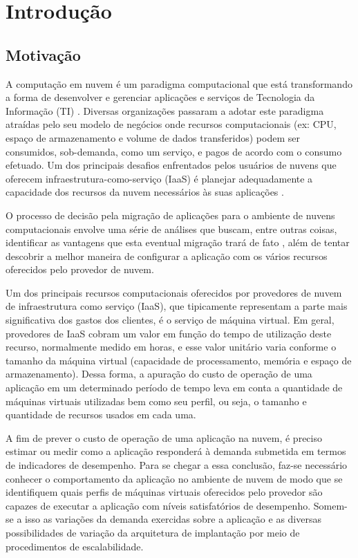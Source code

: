 \chapter[Introdução]{Introdução}
\section{Motivação}
A computação em nuvem é um paradigma computacional que está
transformando a forma de desenvolver e gerenciar aplicações e serviços de
Tecnologia da Informação (TI) \cite{Murugesan2014}. Diversas organizações passaram 
a adotar este paradigma atraídas pelo seu modelo de negócios onde recursos 
computacionais (ex: CPU, espaço de armazenamento e volume de dados transferidos) 
podem ser consumidos, sob-demanda, como um serviço, e pagos de acordo com o consumo 
efetuado. Um dos principais desafios enfrentados pelos usuários de nuvens que oferecem 
infraestrutura-como-serviço (IaaS) é planejar adequadamente a capacidade 
dos recursos da nuvem necessários às suas aplicações \cite{Menasce2009}.  

O processo de decisão pela migração de aplicações para o ambiente de nuvens 
computacionais envolve uma série de análises que buscam, entre outras coisas, 
identificar as vantagens que esta eventual migração trará de fato \cite{beserra2012cloudstep, 
rodero2010infrastructure}, além de tentar descobrir a melhor maneira de configurar 
a aplicação com os vários recursos oferecidos pelo provedor de nuvem.

Um dos principais recursos computacionais oferecidos por provedores de nuvem de 
infraestrutura como serviço (IaaS), que tipicamente representam a parte mais 
significativa dos gastos dos
clientes, é o serviço de máquina virtual. Em geral, provedores de IaaS cobram um
valor em função do tempo de utilização deste recurso, normalmente medido em horas, 
e esse valor unitário varia conforme o tamanho da máquina virtual (capacidade de 
processamento, memória e espaço de armazenamento). Dessa forma, a apuração do 
custo de operação de uma aplicação em um determinado período de tempo leva em 
conta a quantidade de máquinas virtuais utilizadas bem como seu perfil, ou seja, 
o tamanho e quantidade de recursos usados em cada uma.
 
A fim de prever o custo de operação de uma aplicação na nuvem, é preciso estimar ou 
medir como a aplicação responderá à demanda submetida em termos de indicadores de 
desempenho. Para se chegar a essa conclusão, faz-se necessário conhecer o 
comportamento da aplicação no ambiente de nuvem de modo que se identifiquem quais 
perfis de máquinas virtuais oferecidos pelo provedor são capazes de executar a 
aplicação com níveis satisfatórios de desempenho. Somem-se a isso as variações 
da demanda exercidas sobre a aplicação e as diversas possibilidades de variação 
da arquitetura de implantação por meio de procedimentos de escalabilidade.
 
